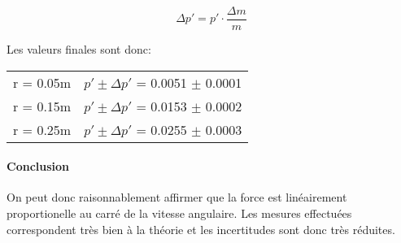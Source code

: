 \begin{equation}
    \Delta p' = p' \cdot \frac{\Delta m}{m}
\end{equation}

Les valeurs finales sont donc:

\begin{table}[ht]
    \centering
    \begin{tabular}{l l}
	r = 0.05m & $p'\pm \Delta p'$ = 0.0051 $\pm$ 0.0001\\
	r = 0.15m & $p'\pm \Delta p'$ = 0.0153 $\pm$ 0.0002\\
	r = 0.25m & $p'\pm \Delta p'$ = 0.0255 $\pm$ 0.0003\\
    \end{tabular}
\end{table}

\paragraph{Conclusion}

On peut donc raisonnablement affirmer que la force est linéairement proportionelle au carré de la vitesse angulaire.
Les mesures effectuées correspondent très bien à la théorie et les incertitudes sont donc très réduites.
